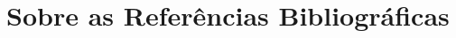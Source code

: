 \documentclass{pssbmac}
\begin{document}








\section{Sobre as Referências Bibliográficas}
\end{document}
